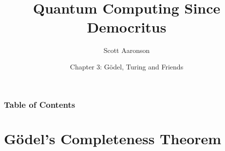 \documentclass[
    11pt, %
    aspectratio=169, %
]{beamer}
\title[Gödel, Turing and Friends]{Quantum Computing Since Democritus}
\subtitle{Scott Aaronson}
\author[Quantum Computing Since Democritus]{Chapter 3: Gödel, Turing and Friends}
\institute[]{Saumya Chaturvedi \\ \smallskip }
\date[24 March 2023]
\begin{document}
\section{}
\begin{frame}
	\titlepage %
 
\end{frame}


\begin{frame}
	\frametitle{Table of Contents} %
	
	\tableofcontents %
\end{frame}

\section{Gödel's Completeness Theorem}
\end{document}
